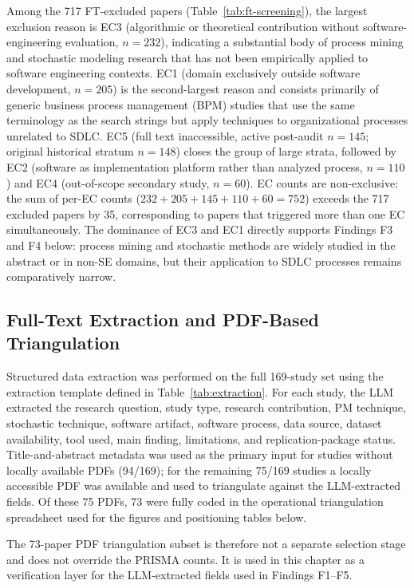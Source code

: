 Among the 717 FT-excluded papers (Table~\ref{tab:ft-screening}), the largest
exclusion reason is EC3 (algorithmic or theoretical contribution without
software-engineering evaluation, $n=232$), indicating a substantial body of
process mining and stochastic modeling research that has not been empirically
applied to software engineering contexts. EC1 (domain exclusively outside
software development, $n=205$) is the second-largest reason and consists
primarily of generic business process management (BPM) studies that use the
same terminology as the search strings but apply techniques to organizational
processes unrelated to SDLC. EC5 (full text inaccessible, active post-audit
$n=145$; original historical stratum $n=148$) closes the group of large
strata, followed by EC2 (software as implementation platform
rather than analyzed process, $n=110$) and EC4 (out-of-scope secondary study,
$n=60$). EC counts are non-exclusive: the sum of per-EC counts
($232+205+145+110+60 = 752$) exceeds the 717 excluded papers by 35,
corresponding to papers that triggered more than one EC simultaneously. The
dominance of EC3 and EC1 directly supports Findings F3 and F4
below: process mining and stochastic methods are widely studied in the
abstract or in non-SE domains, but their application to SDLC processes
remains comparatively narrow.

\subsection{Full-Text Extraction and PDF-Based Triangulation}
\label{sec:slr-pdf-enrichment}

Structured data extraction was performed on the full 169-study set using the
extraction template defined in Table~\ref{tab:extraction}. For each study,
the LLM extracted the research question, study type, research contribution,
PM technique, stochastic technique, software artifact, software process, data
source, dataset availability, tool used, main finding, limitations, and
replication-package status. Title-and-abstract metadata was used as the
primary input for studies without locally available PDFs (94/169); for the
remaining 75/169 studies a locally accessible PDF was available and used to
triangulate against the LLM-extracted fields. Of these 75 PDFs, 73 were
fully coded in the operational triangulation spreadsheet used for the
figures and positioning tables below.

The 73-paper PDF triangulation subset is therefore not a separate selection
stage and does not override the PRISMA counts. It is used in this chapter as
a verification layer for the LLM-extracted fields used in Findings F1--F5.

